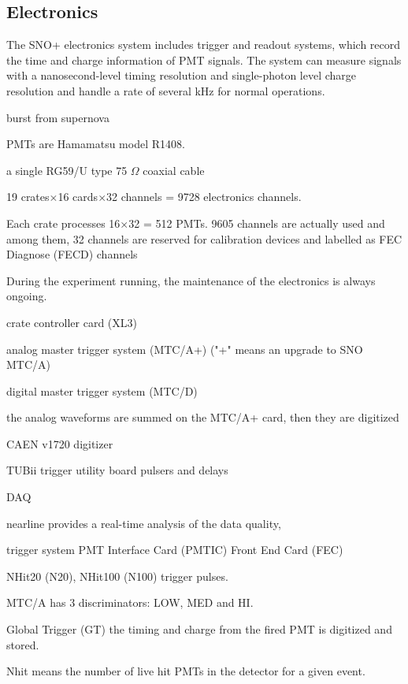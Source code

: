 \subsection{Electronics}

The SNO+ electronics system includes trigger and readout systems, which record the time and charge information of PMT signals. The system can measure signals with a nanosecond-level timing resolution and single-photon level charge resolution and handle a rate of several kHz for normal operations.

burst 
from supernova









PMTs are Hamamatsu model R1408.


a single RG59/U type 75 $\Omega$ coaxial cable

19 crates$\times$16 cards$\times$32 channels = 9728 electronics channels.

Each crate processes 16$\times$32 = 512 PMTs.
9605 channels are actually used and among them, 32 channels are reserved for calibration devices and labelled as FEC Diagnose (FECD) channels


During the experiment running, the maintenance of the electronics is always ongoing.

crate controller card (XL3)


analog master trigger system (MTC/A+) 
("+" means an upgrade to SNO MTC/A)


digital master trigger system (MTC/D)

the analog waveforms are summed on the MTC/A+ card, then they are digitized 

CAEN v1720 digitizer 

TUBii trigger utility board 
pulsers and delays

DAQ 


nearline provides a real-time analysis of the data quality, 

trigger system
PMT Interface Card (PMTIC)
Front End Card (FEC)

NHit20 (N20), NHit100 (N100) trigger pulses.

MTC/A has 3 discriminators: LOW, MED and HI.

Global Trigger (GT)
the timing and charge from the fired PMT is digitized and stored.




Nhit means the number of live hit PMTs in the detector for a given event.


